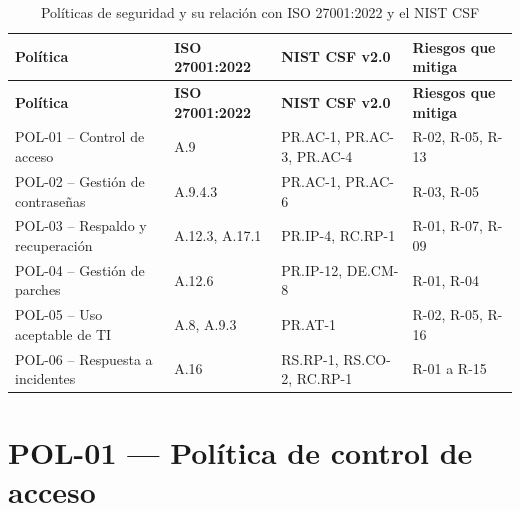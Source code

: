 \documentclass[11pt, a4paper, oneside]{report}
\begin{document}
\begin{xltabular}{\textwidth}{@{}|L{4.2cm}|L{2.6cm}|L{2.6cm}|X|@{}}
\caption{Políticas de seguridad y su relación con ISO 27001:2022 y el NIST CSF}
\label{tab:marco_general_politicas} \\

\parbox[c][1.1cm][c]{\linewidth}{\centering\color{white}\bfseries\small Política} &
\parbox[c][1.1cm][c]{\linewidth}{\centering\color{white}\bfseries\small ISO 27001:2022} &
\parbox[c][1.1cm][c]{\linewidth}{\centering\color{white}\bfseries\small NIST CSF v2.0} &
\parbox[c][1.1cm][c]{\linewidth}{\centering\color{white}\bfseries\small Riesgos que mitiga} \\ \hline
\endfirsthead

\parbox[c][1.1cm][c]{\linewidth}{\centering\color{white}\bfseries\small Política} &
\parbox[c][1.1cm][c]{\linewidth}{\centering\color{white}\bfseries\small ISO 27001:2022} &
\parbox[c][1.1cm][c]{\linewidth}{\centering\color{white}\bfseries\small NIST CSF v2.0} &
\parbox[c][1.1cm][c]{\linewidth}{\centering\color{white}\bfseries\small Riesgos que mitiga} \\ \hline
\endhead

\hline
\endfoot

{\small POL-01 -- Control de acceso} & {\small A.9} & {\small PR.AC-1, PR.AC-3, PR.AC-4} & {\small R-02, R-05, R-13} \\ \hline
{\small POL-02 -- Gestión de contraseñas} & {\small A.9.4.3} & {\small PR.AC-1, PR.AC-6} & {\small R-03, R-05} \\ \hline
{\small POL-03 -- Respaldo y recuperación} & {\small A.12.3, A.17.1} & {\small PR.IP-4, RC.RP-1} & {\small R-01, R-07, R-09} \\ \hline
{\small POL-04 -- Gestión de parches} & {\small A.12.6} & {\small PR.IP-12, DE.CM-8} & {\small R-01, R-04} \\ \hline
{\small POL-05 -- Uso aceptable de TI} & {\small A.8, A.9.3} & {\small PR.AT-1} & {\small R-02, R-05, R-16} \\ \hline
{\small POL-06 -- Respuesta a incidentes} & {\small A.16} & {\small RS.RP-1, RS.CO-2, RC.RP-1} & {\small R-01 a R-15} \\ \hline

\end{xltabular}

\normalsize

\section{POL-01 — Política de control de acceso}
\end{document}
